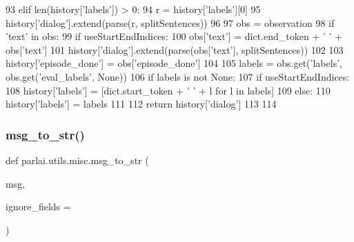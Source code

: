 \begin{DoxyCode}
93         \textcolor{keywordflow}{elif} len(history[\textcolor{stringliteral}{'labels'}]) > 0:
94             r = history[\textcolor{stringliteral}{'labels'}][0]
95             history[\textcolor{stringliteral}{'dialog'}].extend(parse(r, splitSentences))
96 
97     obs = observation
98     \textcolor{keywordflow}{if} \textcolor{stringliteral}{'text'} \textcolor{keywordflow}{in} obs:
99         \textcolor{keywordflow}{if} useStartEndIndices:
100             obs[\textcolor{stringliteral}{'text'}] = dict.end\_token + \textcolor{stringliteral}{' '} + obs[\textcolor{stringliteral}{'text'}]
101         history[\textcolor{stringliteral}{'dialog'}].extend(parse(obs[\textcolor{stringliteral}{'text'}], splitSentences))
102 
103     history[\textcolor{stringliteral}{'episode\_done'}] = obs[\textcolor{stringliteral}{'episode\_done'}]
104 
105     labels = obs.get(\textcolor{stringliteral}{'labels'}, obs.get(\textcolor{stringliteral}{'eval\_labels'}, \textcolor{keywordtype}{None}))
106     \textcolor{keywordflow}{if} labels \textcolor{keywordflow}{is} \textcolor{keywordflow}{not} \textcolor{keywordtype}{None}:
107         \textcolor{keywordflow}{if} useStartEndIndices:
108             history[\textcolor{stringliteral}{'labels'}] = [dict.start\_token + \textcolor{stringliteral}{' '} + l \textcolor{keywordflow}{for} l \textcolor{keywordflow}{in} labels]
109         \textcolor{keywordflow}{else}:
110             history[\textcolor{stringliteral}{'labels'}] = labels
111 
112     \textcolor{keywordflow}{return} history[\textcolor{stringliteral}{'dialog'}]
113 
114 
\end{DoxyCode}
\mbox{\label{namespaceparlai_1_1utils_1_1misc_ae5db473b41d3b49814e2566e866282b6}} 
\subsubsection{\texorpdfstring{msg\+\_\+to\+\_\+str()}{msg\_to\_str()}}
{\footnotesize\ttfamily def parlai.\+utils.\+misc.\+msg\+\_\+to\+\_\+str (\begin{DoxyParamCaption}\item[{}]{msg,  }\item[{}]{ignore\+\_\+fields = {\ttfamily \textquotesingle{}\textquotesingle{}} }\end{DoxyParamCaption})}

